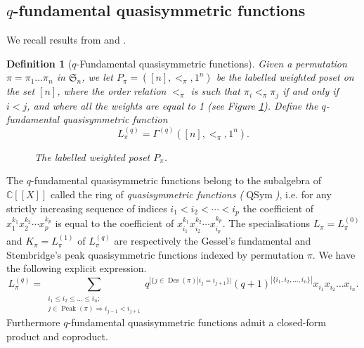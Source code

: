 \documentclass[revision]{FPSAC2024}
\newtheorem{defn}{Definition}
\newcommand{\CC}{\mathbb{C}} %
\newcommand{\QSym}{\operatorname{QSym}}
\newcommand{\Des}{\operatorname{Des}}
\newcommand{\Peak}{\operatorname{Peak}}
\begin{document}
\subsection{$q$-fundamental quasisymmetric functions}
We recall results from \cite{GriVas22} and \cite{GriVas23}.
\begin{defn}[$q$-Fundamental quasisymmetric functions]
Given a permutation $\pi=\pi_1\dots\pi_n$ in $\mathfrak{S}_n$, we let $P_{\pi} = ([n],<_\pi,1^n)$ be the labelled weighted poset on the set $[n]$, where the order relation $<_\pi$ is such that $\pi_i <_\pi \pi_j$ if and only if $i < j$, and where all the weights are equal to 1 (see Figure \ref{fig : monomial}).
Define the \emph{$q$-fundamental quasisymmetric function}
\begin{equation*}
L_{\pi}^{(q)} = \Gamma^{(q)}([n],<_\pi, 1^n).
\end{equation*}
\begin{figure}[htbp]
\begin{center}
\end{center}
\caption{The labelled weighted poset $P_{\pi}$.}
\label{fig : monomial}
\end{figure}
\end{defn}
\noindent The $q$-fundamental quasisymmetric functions belong to the subalgebra of $\CC \left[\left[ X \right]\right]$ called the ring of \emph{quasisymmetric functions ($\QSym$)}, i.e. for any strictly increasing sequence of indices $i_1 < i_2 <\cdots< i_p$ the coefficient of $x_1^{k_1}x_2^{k_2}\cdots x_p^{k_p}$ is equal to the coefficient of $x_{i_1}^{k_1}x_{i_2}^{k_2}\cdots x_{i_p}^{k_p}$. The specialisations $L_{\pi} = L_{\pi}^{(0)}$ and $K_{\pi}=L_{\pi}^{(1)}$ of $L_{\pi}^{(q)}$ are respectively the Gessel's fundamental \cite{Ges84} and Stembridge's peak \cite{Ste97} quasisymmetric functions indexed by permutation $\pi$. We have the following explicit expression.
\begin{equation}
L_{\pi}^{(q)}=\sum_{\substack{i_{1}\leq i_{2}\leq
\dots\leq i_{n};\\j\in\Peak(\pi)\Rightarrow 
i_{j-1}<i_{j+1}  }}q^{|\{j\in\Des(\pi
)|i_{j}=i_{j+1}\}|}(q+1)^{|\{i_{1},i_{2},\dots, i_{n}\}|}x_{i_{1}}x_{i_{2}}\dots x_{i_{n}}.
\label{eq : Lqq}
\end{equation}
Furthermore $q$-fundamental quasisymmetric functions admit a closed-form product and coproduct.
\end{document}
